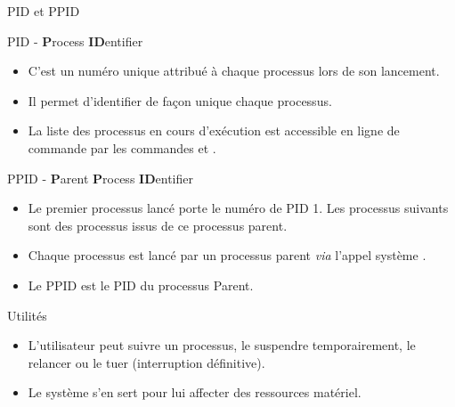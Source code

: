 \begin{frame}{PID et PPID}
  \begin{block}{PID - \textbf{P}rocess \textbf{ID}entifier}
    \begin{itemize}
    \item C'est un numéro unique attribué à chaque processus lors de son
      lancement.
    \item Il permet d'identifier de façon unique chaque processus.
    \item La liste des processus en cours d'exécution est accessible en
      ligne de commande par les commandes  et .
    \end{itemize}
  \end{block}
  \begin{block}{PPID - \textbf{P}arent \textbf{P}rocess
      \textbf{ID}entifier}
    \begin{itemize}
    \item Le premier processus lancé porte le numéro de PID 1. Les
      processus suivants sont des processus issus de ce processus
      parent.
    \item Chaque processus est lancé par un processus parent
      \textit{via} l'appel système .
    \item Le PPID est le PID du processus Parent.
    \end{itemize}
  \end{block}
  \begin{block}{Utilités}
    \begin{itemize}
    \item L'utilisateur peut suivre un processus, le suspendre
      temporairement, le relancer ou le tuer (interruption définitive).
    \item Le système s'en sert pour lui affecter des ressources
      matériel.
    \end{itemize}
  \end{block}
\end{frame}
